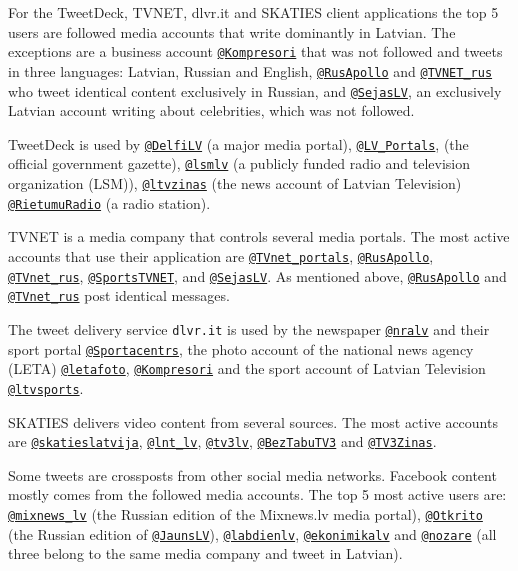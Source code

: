 \documentclass{IOS-Book-Article}
\makeatletter
\newcommand{\sn}[1]{\href{https://twitter.com/#1}{\texttt{@#1}}}
\makeatother
\begin{document}
For the TweetDeck, TVNET, dlvr.it and SKATIES client applications the top 5 users are followed media accounts that write dominantly in Latvian. The exceptions are a business account \sn{Kompresori} that was not followed and tweets in three languages: Latvian, Russian and English, \sn{RusApollo} and \sn{TVNET\_rus} who tweet identical content exclusively in Russian, and \sn{SejasLV}, an exclusively Latvian account writing about celebrities, which was not followed.


TweetDeck is used by \sn{DelfiLV} (a major media portal), \sn{LV\_Portals}, (the official government gazette), \sn{lsmlv} (a publicly funded radio and television organization (LSM)), \sn{ltvzinas} (the news account of Latvian Television) \sn{RietumuRadio} (a radio station). 

TVNET is a media company that controls several media portals. The most active accounts that use their application are \sn{TVnet\_portals}, \sn{RusApollo}, \sn{TVnet\_rus}, \sn{SportsTVNET}, and \sn{SejasLV}. As mentioned above, \sn{RusApollo} and \sn{TVnet\_rus} post identical messages.

The tweet delivery service \texttt{dlvr.it} is used by the newspaper \sn{nralv} and their sport portal \sn{Sportacentrs}, the photo account of the national news agency (LETA) \sn{letafoto}, \sn{Kompresori} and the sport account of Latvian Television \sn{ltvsports}.

SKATIES delivers video content from several sources. The most active accounts are \sn{skatieslatvija}, \sn{lnt\_lv}, \sn{tv3lv}, \sn{BezTabuTV3} and \sn{TV3Zinas}.

Some tweets are crossposts from other social media networks. Facebook content mostly comes from the followed media accounts. The top 5 most active users are: \sn{mixnews\_lv} (the Russian edition of the Mixnews.lv media portal), \sn{Otkrito} (the Russian edition of \sn{JaunsLV}), \sn{labdienlv}, \sn{ekonimikalv} and \sn{nozare} (all three belong to the same media company and tweet in Latvian).
\end{document}
